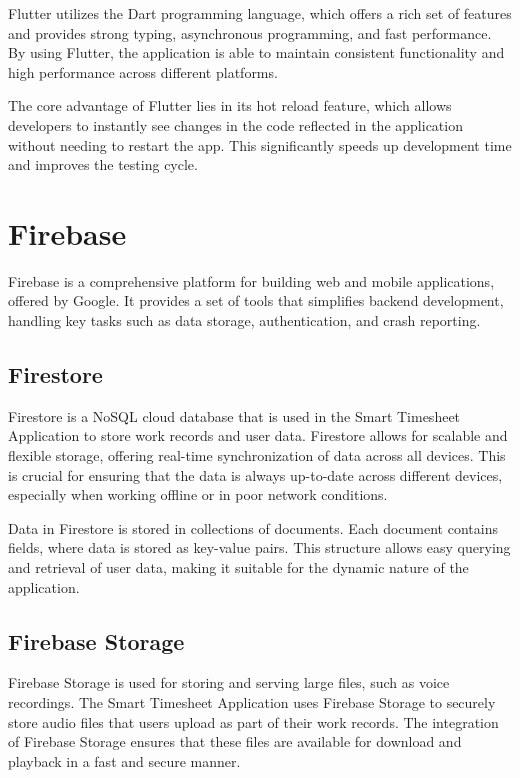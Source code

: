 \documentclass[
  digital,     %
  oneside,     %
  nosansbold,  %
  nocolorbold, %
  lof,         %
  lot,         %
]{fithesis4}
\begin{document}
Flutter utilizes the Dart programming language, which offers a rich set of features and provides strong typing, asynchronous programming, and fast performance. By using Flutter, the application is able to maintain consistent functionality and high performance across different platforms.

The core advantage of Flutter lies in its hot reload feature, which allows developers to instantly see changes in the code reflected in the application without needing to restart the app. This significantly speeds up development time and improves the testing cycle.

\section{Firebase}

Firebase is a comprehensive platform for building web and mobile applications, offered by Google. It provides a set of tools that simplifies backend development, handling key tasks such as data storage, authentication, and crash reporting.

\subsection{Firestore}

Firestore is a NoSQL cloud database that is used in the Smart Timesheet Application to store work records and user data. Firestore allows for scalable and flexible storage, offering real-time synchronization of data across all devices. This is crucial for ensuring that the data is always up-to-date across different devices, especially when working offline or in poor network conditions.

Data in Firestore is stored in collections of documents. Each document contains fields, where data is stored as key-value pairs. This structure allows easy querying and retrieval of user data, making it suitable for the dynamic nature of the application.

\subsection{Firebase Storage}

Firebase Storage is used for storing and serving large files, such as voice recordings. The Smart Timesheet Application uses Firebase Storage to securely store audio files that users upload as part of their work records. The integration of Firebase Storage ensures that these files are available for download and playback in a fast and secure manner.
\end{document}

